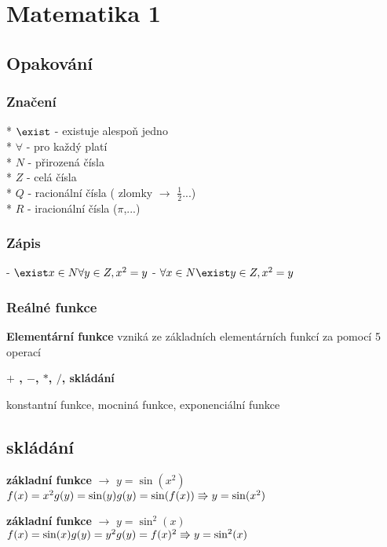 


\section*{Matematika 1}
\subsection*{\textbf{Opakování}}
\subsubsection*{Značení}
* $\exist$ - existuje alespoň jedno \\
* $\forall$ - pro každý platí \\
* $N$ - přirozená čísla \\
* $Z$ - celá čísla \\
* $Q$ - racionální čísla ( zlomky $\rightarrow$ $\frac{1}{2}$...) \\
* $R$ - iracionální čísla ($\pi$,...) 
\subsubsection*{\textbf{Zápis}}
- $\exist x \in N \forall y \in Z,x^2=y$
- $\forall x\in N \exist y \in Z, x^2=y$
\subsubsection*{\textbf{Reálné funkce}}
\begin{description}
    \item \textbf{Elementární funkce} vzniká ze základních elementárních funkcí za pomocí 5 operací
    \item \textbf{$+$ , $-$, $*$, $/$, skládání}
    \item  konstantní funkce, mocniná funkce, exponenciální funkce
\end{description}

\subsection*{skládání}
\textbf{základní funkce} $\rightarrow$ $y=\sin(x^2)$
$f(x)=x^2 \\
g(y) = \sin(y) \\
g(y)= \sin(f(x)) \Rrightarrow y = \sin(x^2)$

\textbf{základní funkce} $\rightarrow$ $y=\sin^2(x)$
$f(x)=\sin(x) \\
g(y) = y^2 \\
g(y)= f(x)^2 \Rrightarrow y = \sin^2(x)$

